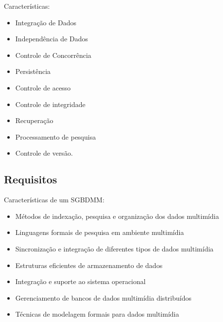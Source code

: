 \documentclass{beamer}
\begin{document}
        \begin{frame}{Características:}

        \begin{itemize}
            \item Integração de Dados 
            \pause \item Independência de Dados
            \pause \item Controle de Concorrência
            \pause \item Persistência
            \pause \item Controle de acesso
            \pause \item Controle de integridade
            \pause \item Recuperação
            \pause \item Processamento de pesquisa
            \pause \item Controle de versão.
            \end{itemize}
        \end{frame}

    \subsection{Requisitos}
    
        \begin{frame}{Características de um SGBDMM:}

        \begin{itemize}
            \item Métodos de indexação, pesquisa e organização dos dados multimídia
            \item Linguagens formais de pesquisa em ambiente multimídia
             \item Sincronização e integração de diferentes tipos de dados multimídia
            \item Estruturas eficientes de armazenamento de dados
            \item Integração e suporte ao sistema operacional
            \item Gerenciamento de bancos de dados multimídia distribuídos
            \item Técnicas de modelagem formais para dados multimídia
            \end{itemize}
        \end{frame}
        
\end{document}
